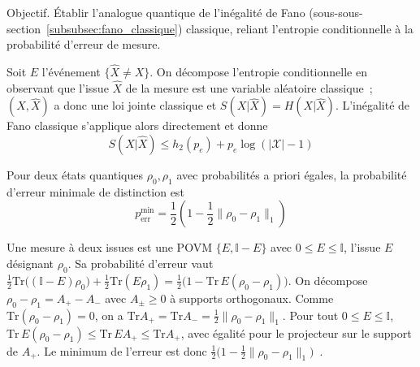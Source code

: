 \begin{sloppypar}
\begin{Preuve}\label{prv:fano_quantique}

\begin{cmtEtape}{Objectif.}
\'Etablir l'analogue quantique de l'in\'egalit\'e de Fano (sous-sous-section~\ref{subsubsec:fano_classique}) classique,
reliant l'entropie conditionnelle \`a la probabilit\'e d'erreur de mesure.
\end{cmtEtape}

Soit $E$ l'\'ev\'enement $\{\hat{X} \neq X\}$. On d\'ecompose l'entropie
conditionnelle en observant que l'issue $\hat{X}$ de la mesure est une variable al\'eatoire classique~;
$(X,\hat{X})$ a donc une loi jointe classique et $S(X|\hat{X}) = H(X|\hat{X})$.
L'in\'egalit\'e de Fano classique s'applique alors directement et donne
\begin{equation}
S(X|\hat{X}) \leq h_2(p_e) + p_e \log(|\mathcal{X}| - 1)
\end{equation}
\end{Preuve}

\begin{lemma}\label{lem:holevo_helstrom}
Pour deux \'etats quantiques $\rho_0, \rho_1$ avec probabilit\'es a priori
\'egales, la probabilit\'e d'erreur minimale de distinction est
\begin{equation}
p_{\mathrm{err}}^{\min} = \frac{1}{2}\left(1 - \frac{1}{2}\|\rho_0 - \rho_1\|_1\right)
\end{equation}
\end{lemma}

\begin{Preuve}
Une mesure \`a deux issues est une POVM $\{E, \mathbb{I}-E\}$ avec
$0 \leq E \leq \mathbb{I}$, l'issue $E$ d\'esignant $\rho_0$. Sa probabilit\'e
d'erreur vaut $\tfrac12\mathrm{Tr}\bigl((\mathbb{I}-E)\rho_0\bigr) + \tfrac12\mathrm{Tr}(E\rho_1)
= \tfrac12\bigl(1 - \mathrm{Tr}\,E(\rho_0-\rho_1)\bigr)$. On d\'ecompose
$\rho_0 - \rho_1 = A_+ - A_-$ avec $A_\pm \geq 0$ \`a supports orthogonaux. Comme
$\mathrm{Tr}(\rho_0-\rho_1) = 0$, on a $\mathrm{Tr}A_+ = \mathrm{Tr}A_- = \tfrac12\|\rho_0-\rho_1\|_1$.
Pour tout $0 \leq E \leq \mathbb{I}$, $\mathrm{Tr}\,E(\rho_0-\rho_1) \leq \mathrm{Tr}\,EA_+ \leq \mathrm{Tr}A_+$,
avec \'egalit\'e pour le projecteur sur le support de $A_+$. Le minimum de
l'erreur est donc $\tfrac12\bigl(1 - \tfrac12\|\rho_0-\rho_1\|_1\bigr)$~\cite{Wilde2017}.
\end{Preuve}


\end{sloppypar}
